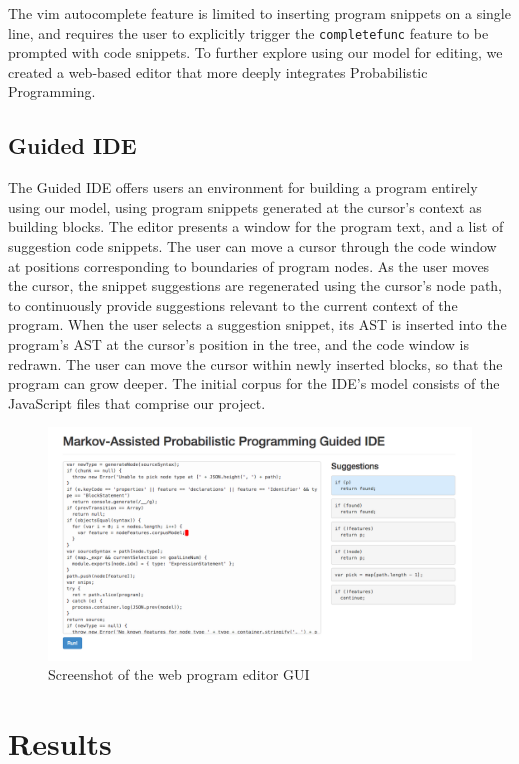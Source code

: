 \documentclass{article}
\begin{document}
The vim autocomplete feature is limited to inserting program snippets on a single
line, and requires the user to explicitly trigger the \texttt{completefunc}
feature to be prompted with code snippets. To further explore using our model
for editing, we created a web-based editor that more deeply integrates Probabilistic
Programming.

\subsection{Guided IDE}

The Guided IDE offers users an environment for building a program entirely using
our model, using program snippets generated at the cursor's context as building
blocks. The editor presents a window for the program text, and a list of
suggestion code snippets. The user can move a cursor through the code window at
positions corresponding to boundaries of program nodes. As the user moves the
cursor, the snippet suggestions are regenerated using the cursor's node path, to
continuously provide suggestions relevant to the current context of the program. When the
user selects a suggestion snippet, its AST is inserted into the program's AST at
the cursor's position in the tree, and the code window is redrawn. The user can
move the cursor within newly inserted blocks, so that the program can grow
deeper. The initial corpus for the IDE's model consists of the JavaScript files
that comprise our project.

\begin{figure}[h]
  \centering
  \includegraphics[width=1.00\textwidth]{screenshot}
  \caption{Screenshot of the web program editor GUI} \label{fig:screenshot}
\end{figure}

\section{Results}
\end{document}
